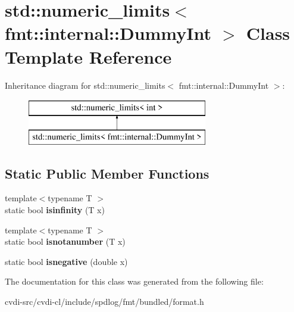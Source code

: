 \hypertarget{classstd_1_1numeric__limits_3_01fmt_1_1internal_1_1DummyInt_01_4}{}\section{std\+:\+:numeric\+\_\+limits$<$ fmt\+:\+:internal\+:\+:Dummy\+Int $>$ Class Template Reference}
\label{classstd_1_1numeric__limits_3_01fmt_1_1internal_1_1DummyInt_01_4}
Inheritance diagram for std\+:\+:numeric\+\_\+limits$<$ fmt\+:\+:internal\+:\+:Dummy\+Int $>$\+:\begin{figure}[H]
\begin{center}
\leavevmode
\includegraphics[height=2.000000cm]{classstd_1_1numeric__limits_3_01fmt_1_1internal_1_1DummyInt_01_4}
\end{center}
\end{figure}
\subsection*{Static Public Member Functions}
\begin{DoxyCompactItemize}
\item 
{\footnotesize template$<$typename T $>$ }\\static bool {\bfseries isinfinity} (T x)\hypertarget{classstd_1_1numeric__limits_3_01fmt_1_1internal_1_1DummyInt_01_4_abd1469673d6c36a014a988bce1dfb0ee}{}\label{classstd_1_1numeric__limits_3_01fmt_1_1internal_1_1DummyInt_01_4_abd1469673d6c36a014a988bce1dfb0ee}

\item 
{\footnotesize template$<$typename T $>$ }\\static bool {\bfseries isnotanumber} (T x)\hypertarget{classstd_1_1numeric__limits_3_01fmt_1_1internal_1_1DummyInt_01_4_a89433356fbf5b68eb0c13208a5e3b6b1}{}\label{classstd_1_1numeric__limits_3_01fmt_1_1internal_1_1DummyInt_01_4_a89433356fbf5b68eb0c13208a5e3b6b1}

\item 
static bool {\bfseries isnegative} (double x)\hypertarget{classstd_1_1numeric__limits_3_01fmt_1_1internal_1_1DummyInt_01_4_a1cc82945f63918e9a8603d3ef750990d}{}\label{classstd_1_1numeric__limits_3_01fmt_1_1internal_1_1DummyInt_01_4_a1cc82945f63918e9a8603d3ef750990d}

\end{DoxyCompactItemize}


The documentation for this class was generated from the following file\+:\begin{DoxyCompactItemize}
\item 
cvdi-\/src/cvdi-\/cl/include/spdlog/fmt/bundled/format.\+h\end{DoxyCompactItemize}
